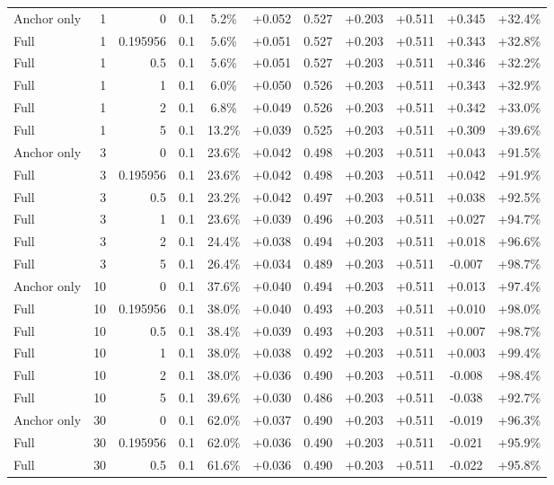 \begin{table}[htbp]
\begin{tabular}{lrrrccccccc}
Anchor only & 1 & 0 & 0.1 & 5.2\% & +0.052 & 0.527 & +0.203 & +0.511 & +0.345 & +32.4\% \\
Full & 1 & 0.195956 & 0.1 & 5.6\% & +0.051 & 0.527 & +0.203 & +0.511 & +0.343 & +32.8\% \\
Full & 1 & 0.5 & 0.1 & 5.6\% & +0.051 & 0.527 & +0.203 & +0.511 & +0.346 & +32.2\% \\
Full & 1 & 1 & 0.1 & 6.0\% & +0.050 & 0.526 & +0.203 & +0.511 & +0.343 & +32.9\% \\
Full & 1 & 2 & 0.1 & 6.8\% & +0.049 & 0.526 & +0.203 & +0.511 & +0.342 & +33.0\% \\
Full & 1 & 5 & 0.1 & 13.2\% & +0.039 & 0.525 & +0.203 & +0.511 & +0.309 & +39.6\% \\
Anchor only & 3 & 0 & 0.1 & 23.6\% & +0.042 & 0.498 & +0.203 & +0.511 & +0.043 & +91.5\% \\
Full & 3 & 0.195956 & 0.1 & 23.6\% & +0.042 & 0.498 & +0.203 & +0.511 & +0.042 & +91.9\% \\
Full & 3 & 0.5 & 0.1 & 23.2\% & +0.042 & 0.497 & +0.203 & +0.511 & +0.038 & +92.5\% \\
Full & 3 & 1 & 0.1 & 23.6\% & +0.039 & 0.496 & +0.203 & +0.511 & +0.027 & +94.7\% \\
Full & 3 & 2 & 0.1 & 24.4\% & +0.038 & 0.494 & +0.203 & +0.511 & +0.018 & +96.6\% \\
Full & 3 & 5 & 0.1 & 26.4\% & +0.034 & 0.489 & +0.203 & +0.511 & -0.007 & +98.7\% \\
Anchor only & 10 & 0 & 0.1 & 37.6\% & +0.040 & 0.494 & +0.203 & +0.511 & +0.013 & +97.4\% \\
Full & 10 & 0.195956 & 0.1 & 38.0\% & +0.040 & 0.493 & +0.203 & +0.511 & +0.010 & +98.0\% \\
Full & 10 & 0.5 & 0.1 & 38.4\% & +0.039 & 0.493 & +0.203 & +0.511 & +0.007 & +98.7\% \\
Full & 10 & 1 & 0.1 & 38.0\% & +0.038 & 0.492 & +0.203 & +0.511 & +0.003 & +99.4\% \\
Full & 10 & 2 & 0.1 & 38.0\% & +0.036 & 0.490 & +0.203 & +0.511 & -0.008 & +98.4\% \\
Full & 10 & 5 & 0.1 & 39.6\% & +0.030 & 0.486 & +0.203 & +0.511 & -0.038 & +92.7\% \\
Anchor only & 30 & 0 & 0.1 & 62.0\% & +0.037 & 0.490 & +0.203 & +0.511 & -0.019 & +96.3\% \\
Full & 30 & 0.195956 & 0.1 & 62.0\% & +0.036 & 0.490 & +0.203 & +0.511 & -0.021 & +95.9\% \\
Full & 30 & 0.5 & 0.1 & 61.6\% & +0.036 & 0.490 & +0.203 & +0.511 & -0.022 & +95.8\% \\

\end{tabular}
\end{table}
